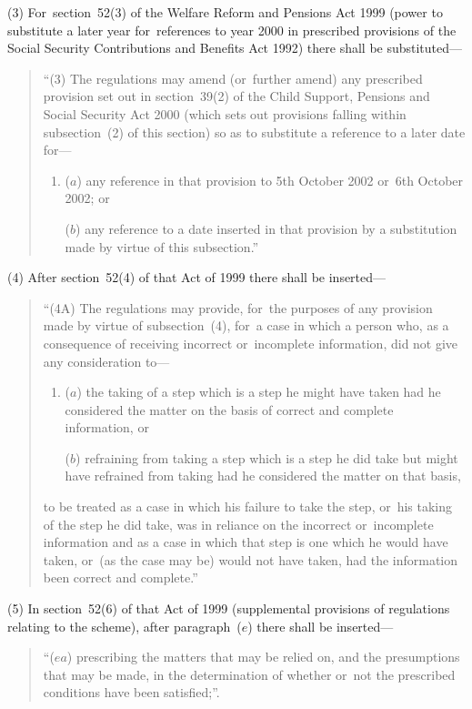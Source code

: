 \documentclass[12pt,a4paper]{article}
\begin{document}
(3) For~section~52(3)  of the Welfare Reform and Pensions Act 1999 (power to substitute a later year for~references to year 2000 in prescribed provisions of the Social Security Contributions and Benefits Act 1992) there shall be substituted—
\begin{quotation}
“(3) The regulations may amend (or~further amend) any prescribed provision set out in section~39(2)  of the Child Support, Pensions and Social Security Act 2000 (which sets out provisions falling within subsection~(2)  of this section) so as to substitute a reference to a later date for—
\begin{enumerate}\item[]
($a$) any reference in that provision to 5th October 2002 or~6th October 2002; or

($b$) any reference to a date inserted in that provision by a substitution made by virtue of this subsection.”
\end{enumerate}
\end{quotation}

(4) After section~52(4)  of that Act of 1999 there shall be inserted—
\begin{quotation}
“(4A) The regulations may provide, for~the purposes of any provision made by virtue of subsection~(4), for~a case in which a person who, as a consequence of receiving incorrect or~incomplete information, did not give any consideration to—
\begin{enumerate}\item[]
($a$) the taking of a step which is a step he might have taken had he considered the matter on the basis of correct and complete information, or

($b$) refraining from taking a step which is a step he did take but might have refrained from taking had he considered the matter on that basis,
\end{enumerate}
to be treated as a case in which his failure to take the step, or~his taking of the step he did take, was in reliance on the incorrect or~incomplete information and as a case in which that step is one which he would have taken, or~(as the case may be) would not have taken, had the information been correct and complete.”
\end{quotation}

(5) In section~52(6)  of that Act of 1999 (supplemental provisions of regulations relating to the scheme), after paragraph~($e$)  there shall be inserted—
\begin{quotation}
“($ea$) prescribing the matters that may be relied on, and the presumptions that may be made, in the determination of whether or~not the prescribed conditions have been satisfied;”.
\end{quotation}
\end{document}
